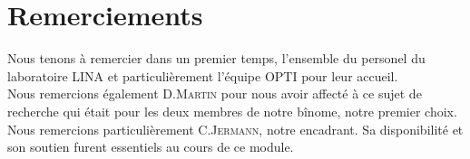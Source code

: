 \section*{Remerciements}
{}
Nous tenons à remercier dans un premier temps, l'ensemble du personel du laboratoire \textsc{LINA} et particulièrement l'équipe \textsc{OPTI} pour leur accueil. \\Nous remercions également D.\textsc{Martin} pour nous avoir affecté à ce sujet de recherche qui était pour les deux membres de notre bînome, notre premier choix. \\
Nous remercions particulièrement C.\textsc{Jermann}, notre encadrant. Sa disponibilité et son soutien furent essentiels au cours de ce module.	
